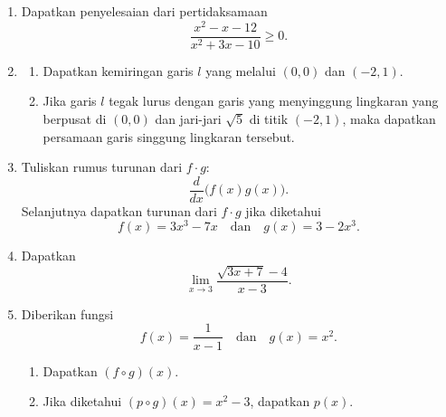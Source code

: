 \documentclass[10pt,letterpaper]{article}
\begin{document}
\begin{enumerate}

  \item Dapatkan penyelesaian dari pertidaksamaan
        \[
          \frac{x^2-x-12}{x^2+3x-10}\ge0.
        \]

  \item \begin{enumerate}
          \item Dapatkan kemiringan garis $l$ yang melalui $(0,0)$ dan $(-2,1)$.
          \item Jika garis $l$ tegak lurus dengan garis yang menyinggung lingkaran
                yang berpusat di $(0,0)$ dan jari-jari $\sqrt5$ di titik $(-2,1)$,
                maka dapatkan persamaan garis singgung lingkaran tersebut.
        \end{enumerate}

  \item Tuliskan rumus turunan dari $f\cdot g$:
        \[
          \frac{d}{dx}\bigl(f(x)g(x)\bigr).
        \]
        Selanjutnya dapatkan turunan dari $f\cdot g$ jika diketahui
        \[
          f(x)=3x^3-7x\quad\text{dan}\quad g(x)=3-2x^3.
        \]

  \item Dapatkan
        \[
          \lim_{x\to3}\frac{\sqrt{3x+7}-4}{x-3}.
        \]

  \item Diberikan fungsi
        \[
          f(x)=\frac1{x-1}\quad\text{dan}\quad g(x)=x^2.
        \]
        \begin{enumerate}
          \item Dapatkan $(f\circ g)(x)$.
          \item Jika diketahui $(p\circ g)(x)=x^2-3$, dapatkan $p(x)$.
        \end{enumerate}

\end{enumerate}
\end{document}
